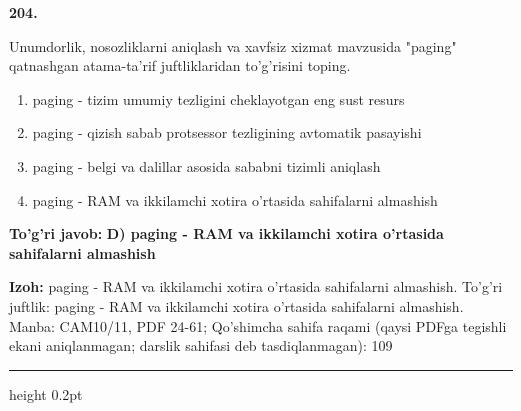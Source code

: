 \documentclass[10pt,a4paper]{article}
\begin{document}
{\bfseries\sffamily\color{ink} 204.}
\par
Unumdorlik, nosozliklarni aniqlash va xavfsiz xizmat mavzusida "paging" qatnashgan atama-ta'rif juftliklaridan to'g'risini toping.
\begin{enumerate}[label=\Alph*),leftmargin=9mm]
\item paging - tizim umumiy tezligini cheklayotgan eng sust resurs
\item paging - qizish sabab protsessor tezligining avtomatik pasayishi
\item paging - belgi va dalillar asosida sababni tizimli aniqlash
\item paging - RAM va ikkilamchi xotira o'rtasida sahifalarni almashish
\end{enumerate}
\begin{tcolorbox}[enhanced,breakable,colback=teal!4,colframe=teal!60!black,boxrule=0.45pt,arc=1.2mm,left=2.7mm,right=2.7mm,top=1.8mm,bottom=1.8mm,before skip=2mm,after skip=2mm]
{\bfseries\sffamily\color{teal}To'g'ri javob:} \textbf{D) paging - RAM va ikkilamchi xotira o'rtasida sahifalarni almashish}
\par\smallskip
{\bfseries Izoh:} paging - RAM va ikkilamchi xotira o'rtasida sahifalarni almashish. To'g'ri juftlik: paging - RAM va ikkilamchi xotira o'rtasida sahifalarni almashish. Manba: CAM10/11, PDF 24-61; Qo'shimcha sahifa raqami (qaysi PDFga tegishli ekani aniqlanmagan; darslik sahifasi deb tasdiqlanmagan): 109
\end{tcolorbox}
\vspace{2mm}\hrule height 0.2pt\vspace{3mm}
\end{document}
